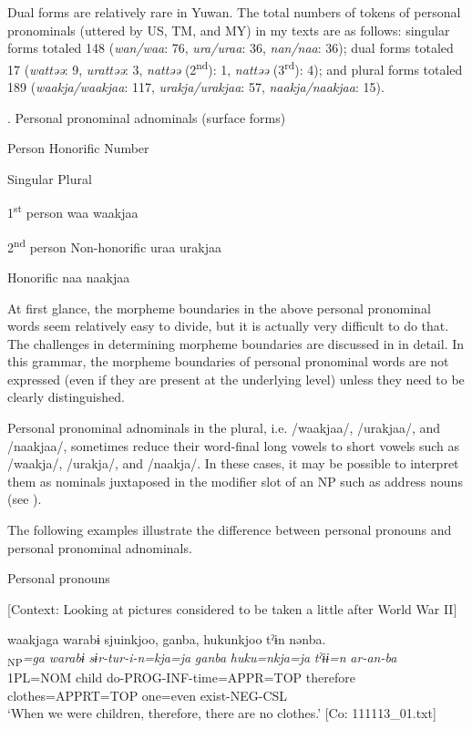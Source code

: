 Dual forms are relatively rare in Yuwan. The total numbers of tokens of personal pronominals (uttered by US, TM, and MY) in my texts are as follows: singular forms totaled 148 (\textit{wan/waa}: 76, \textit{ura/uraa}: 36, \textit{nan/naa}: 36); dual forms totaled 17 (\textit{wattəə}: 9, \textit{urattəə}: 3, \textit{nattəə} (2\textsuperscript{nd}): 1, \textit{nattəə} (3\textsuperscript{rd}): 4); and plural forms totaled 189 (\textit{waakja/waakjaa}: 117, \textit{urakja/urakjaa}: 57, \textit{naakja/naakjaa}: 15). 

\begin{styleBeschriftung}
\textmd{. Personal pronominal adnominals (surface forms)}
\end{styleBeschriftung}

Person  Honorific  Number

    Singular  Plural

1\textsuperscript{st} person    waa  waakjaa

2\textsuperscript{nd} person  Non-honorific  uraa  urakjaa

  Honorific  naa  naakjaa

At first glance, the morpheme boundaries in the above personal pronominal words seem relatively easy to divide, but it is actually very difficult to do that. The challenges in determining morpheme boundaries are discussed in  in detail. In this grammar, the morpheme boundaries of personal pronominal words are not expressed (even if they are present at the underlying level) unless they need to be clearly distinguished.

Personal pronominal adnominals in the plural, i.e. /waakjaa/, /urakjaa/, and /naakjaa/, sometimes reduce their word-final long vowels to short vowels such as /waakja/, /urakja/, and /naakja/. In these cases, it may be possible to interpret them as nominals juxtaposed in the modifier slot of an NP such as address nouns (see ).

  The following examples illustrate the difference between personal pronouns and personal pronominal adnominals.

\ea \label{ex:5:1}  \ea \label{ex:5:1a} Personal pronouns

    [Context: Looking at pictures considered to be taken a little after World War II]

\glll  waakjaga  warabɨ  sjuinkjoo,  ganba,  hukunkjoo  tˀɨn  nənba.\\
[\textit{waakja}\textsubscript{Head}]\textsubscript{NP}\textit{=ga}  \textit{warabɨ}  \textit{sɨr-tur-i-n=kja=ja}  \textit{ganba} \textit{huku=nkja=ja}  \textit{tˀɨɨ=n}  \textit{ar-an-ba}\\
1PL=NOM  child  do-PROG-INF-time=APPR=TOP  therefore   clothes=APPRT=TOP  one=even  exist-NEG-CSL\\
\glt ‘When we were children, therefore, there are no clothes.’ [Co: 111113\_01.txt]

